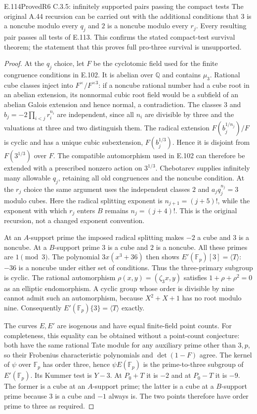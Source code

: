 \begin{result}{E.114}{Proved}{R6 C.3.5: infinitely supported pairs passing the compact tests}
The original A.44 recursion can be carried out with the additional
conditions that $3$ is a noncube modulo every $q_j$ and $2$ is a
noncube modulo every $r_j$. Every resulting pair passes all tests
of E.113. This confirms the stated compact-test survival theorem;
the statement that this proves full pro-three survival is unsupported.
\end{result}
\begin{proof}
At the $q_j$ choice, let $F$ be the cyclotomic field used for the
finite congruence conditions in E.102. It is abelian over $\mathbb Q$
and contains $\mu_3$. Rational cube classes inject into
$F^\times/F^{\times3}$: if a noncube rational number had a cube root
in an abelian extension, its nonnormal cubic root field would be a
subfield of an abelian Galois extension and hence normal, a contradiction.
The classes $3$ and $b_j=-2\prod_{i<j}r_i^{n_i}$ are independent,
since all $n_i$ are divisible by three and the valuations at three
and two distinguish them. The radical extension
$F(b_j^{1/n_j})/F$ is cyclic and has a unique cubic subextension,
$F(b_j^{1/3})$. Hence it is disjoint from $F(3^{1/3})$ over $F$.
The compatible automorphism used in E.102 can therefore be extended
with a prescribed nonzero action on $3^{1/3}$. Chebotarev supplies
infinitely many allowable $q_j$, retaining all old congruences and
the noncube condition. At the $r_j$ choice the same argument uses
the independent classes $2$ and $a_jq_j^{n_j}=3$ modulo cubes.
Here the radical splitting exponent is $n_{j+1}=(j+5)!$, while
the exponent with which $r_j$ enters $B$ remains $n_j=(j+4)!$.
This is the original recursion, not a changed exponent convention.

At an $A$-support prime the imposed radical splitting makes $-2$
a cube and $3$ is a noncube. At a $B$-support prime $3$ is a cube
and $2$ is a noncube. All these primes are $1\pmod3$.
The polynomial $3x(x^3+36)$ then shows
$E'(\mathbb F_p)[3]=\langle T\rangle$: $-36$ is a noncube under
either set of conditions. Thus the three-primary subgroup is cyclic.
The rational automorphism $\rho(x,y)=(\zeta_3x,y)$ satisfies
$1+\rho+\rho^2=0$ as an elliptic endomorphism. A cyclic group
whose order is divisible by nine cannot admit such an automorphism,
because $X^2+X+1$ has no root modulo nine. Consequently
$E'(\mathbb F_p)\{3\}=\langle T\rangle$ exactly.

The curves $E,E'$ are isogenous and have equal finite-field point
counts. For completeness, this equality can be obtained without a
point-count conjecture: both have the same rational Tate module for
any auxiliary prime other than $3,p$, so their Frobenius characteristic
polynomials and $\det(1-F)$ agree. The kernel of $\psi$ over
$\mathbb F_p$ has order three, hence $\psi E(\mathbb F_p)$ is the
prime-to-three subgroup of $E'(\mathbb F_p)$. Its Kummer test is
$Y-3$. At $P_0+T$ it is $-2$ and at $P_0-T$ it is $-9$.
The former is a cube at an $A$-support prime; the latter is a cube
at a $B$-support prime because $3$ is a cube and $-1$ always is.
The two points therefore have order prime to three as required.


\end{proof}
